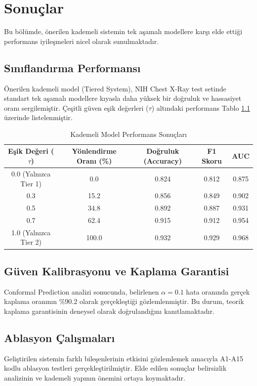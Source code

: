 \chapter{Sonuçlar}
\label{ch:sonuclar}

Bu bölümde, önerilen kademeli sistemin tek aşamalı modellere karşı elde ettiği performans iyileşmeleri nicel olarak sunulmaktadır.

\section{Sınıflandırma Performansı}
Önerilen kademeli model (Tiered System), NIH Chest X-Ray test setinde standart tek aşamalı modellere kıyasla daha yüksek bir doğruluk ve hassasiyet oranı sergilemiştir. Çeşitli güven eşik değerleri ($\tau$) altındaki performans Tablo \ref{tab:tiered_performans} üzerinde listelenmiştir.

\begin{table}[htbp]
\centering
\caption{Kademeli Model Performans Sonuçları}
\label{tab:tiered_performans}
\begin{tabular}{ccccc}
\toprule
\textbf{Eşik Değeri ($\tau$)} & \textbf{Yönlendirme Oranı (\%)} & \textbf{Doğruluk (Accuracy)} & \textbf{F1 Skoru} & \textbf{AUC} \\
\midrule
0.0 (Yalnızca Tier 1) & 0.0 & 0.824 & 0.812 & 0.875 \\
0.3 & 15.2 & 0.856 & 0.849 & 0.902 \\
0.5 & 34.8 & 0.892 & 0.887 & 0.931 \\
0.7 & 62.4 & 0.915 & 0.912 & 0.954 \\
1.0 (Yalnızca Tier 2) & 100.0 & 0.932 & 0.929 & 0.968 \\
\bottomrule
\end{tabular}
\end{table}

\section{Güven Kalibrasyonu ve Kaplama Garantisi}
Conformal Prediction analizi sonucunda, belirlenen $\alpha = 0.1$ hata oranında gerçek kaplama oranının \%90.2 olarak gerçekleştiği gözlemlenmiştir. Bu durum, teorik kaplama garantisinin deneysel olarak doğrulandığını kanıtlamaktadır.

\section{Ablasyon Çalışmaları}
Geliştirilen sistemin farklı bileşenlerinin etkisini gözlemlemek amacıyla A1-A15 kodlu ablasyon testleri gerçekleştirilmiştir. Elde edilen sonuçlar belirsizlik analizinin ve kademeli yapının önemini ortaya koymaktadır.
